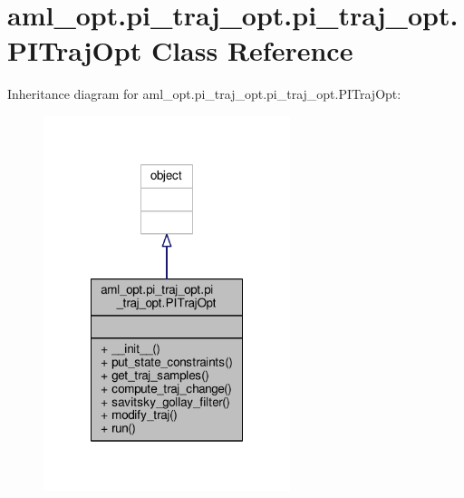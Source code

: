\hypertarget{classaml__opt_1_1pi__traj__opt_1_1pi__traj__opt_1_1_p_i_traj_opt}{\section{aml\-\_\-opt.\-pi\-\_\-traj\-\_\-opt.\-pi\-\_\-traj\-\_\-opt.\-P\-I\-Traj\-Opt Class Reference}
\label{classaml__opt_1_1pi__traj__opt_1_1pi__traj__opt_1_1_p_i_traj_opt}
}


Inheritance diagram for aml\-\_\-opt.\-pi\-\_\-traj\-\_\-opt.\-pi\-\_\-traj\-\_\-opt.\-P\-I\-Traj\-Opt\-:\nopagebreak
\begin{figure}[H]
\begin{center}
\leavevmode
\includegraphics[width=204pt]{classaml__opt_1_1pi__traj__opt_1_1pi__traj__opt_1_1_p_i_traj_opt__inherit__graph}
\end{center}
\end{figure}


